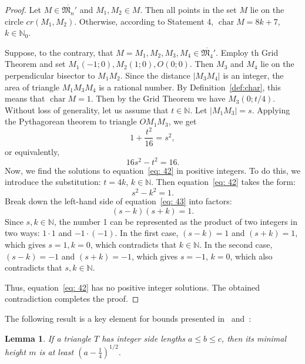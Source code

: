 \documentclass[a4paper,14pt]{article} %
\theoremstyle{plain}
\newtheorem{lemma}[theorem]{Lemma}
\theoremstyle{definition}
\begin{document}
\begin{proof}
	Let $M \in \overline{\mathfrak{M}_n}'$ and $M_1, M_2 \in M$. Then all points in the set $M$ lie on the circle $cr(M_1, M_2)$. Otherwise, according to Statement 4, $\operatorname{char}{M}={8k+7}$, $k\in \mathbb{N}_0$.

	Suppose, to the contrary, that $M={M_1, M_2, M_3, M_4} \in \overline{\mathfrak{M}_4}'$.
	Employ th Grid Theorem and set $M_1(-1;0), M_2(1;0), O(0;0)$.
	Then $M_3$ and $M_4$ lie on the perpendicular bisector to $M_1M_2$.
	Since the distance $|M_3M_4|$ is an integer, the area of triangle $M_1M_3M_4$ is a rational number.
	By Definition~\ref{def:char}, this means that $\operatorname{char}{M}={1}$.
	Then by the Grid Theorem we have $M_3(0;t/4)$. Without loss of generality, let us assume that $t\in\mathbb{N}$. Let $|M_1M_3|=s$. Applying the Pythagorean theorem to triangle $OM_1M_3$, we get
	$$
	1+\frac{t^2}{16}=s^2,
	$$
	or equivalently,
	\begin{equation}
	\label{eq: 42}
	16s^2-t^2=16.
	\end{equation}
	Now, we find the solutions to equation~\eqref{eq: 42} in positive integers.
	To do this, we introduce the substitution: $t=4k$, $k\in\mathbb{N}$.
	Then equation~\eqref{eq: 42} takes the form:
	\begin{equation}
	\label{eq: 43}
	s^2-k^2=1.
	\end{equation}
	Break down the left-hand side of equation~\eqref{eq: 43} into factors:
	\begin{equation}
	\label{eq: 44}
	(s-k)(s+k)=1.
	\end{equation}
	Since $s,k\in\mathbb{N}$, the number 1 can be represented as the product of two integers in two ways: $1\cdot1$ and $-1\cdot(-1)$. In the first case, $(s-k)=1$ and $(s+k)=1$, which gives $s=1,k=0$, which contradicts that $k\in\mathbb{N}$.
	In the second case, $(s-k)=-1$ and $(s+k)=-1$, which gives $s=-1$, $k=0$, which also contradicts that $s,k\in\mathbb{N}$.

	Thus, equation~\eqref{eq: 42} has no positive integer solutions.
	The obtained contradiction completes the proof.
\end{proof}

The following result is a key element for bounds presented
in~\cite{solymosi2003note} and~\cite{my-semi-general-5-4-bound-2019}:

\begin{lemma}
	\cite[Observation 1]{solymosi2003note}
	If a triangle $T$ has integer side lengths $a \leq b \leq c$,
	then its minimal height $m$ is at least $\left(a - \frac{1}{4}\right)^{1/2}$.
\end{lemma}
\end{document}
